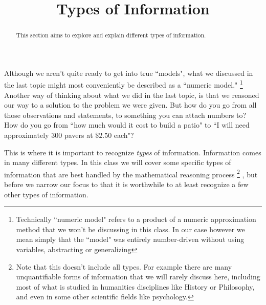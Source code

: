 \documentclass{ximeraXloud}
\title{Types of Information}
\begin{document}
\begin{abstract}
    This section aims to explore and explain different types of information.
\end{abstract}
\maketitle


Although we aren't quite ready to get into true ``models", what we discussed in the last topic might most conveniently be described as a ``numeric model."%
\footnote{Technically ``numeric model" refers to a product of a numeric approximation method that we won't be discussing in this class. In our case however we mean simply that the ``model" was entirely number-driven without using variables, abstracting or generalizing}
Another way of thinking about what we did in the last topic, is that we reasoned our way to a solution to the problem we were given. But how do you go from all those observations and statements, to something you can attach numbers to? How do you go from ``how much would it cost to build a patio" to ``I will need approximately 300 pavers at \$$2.50$ each"?

This is where it is important to recognize \textit{types} of information. Information comes in many different types. In this class we will cover some specific types of information that are best handled by the mathematical reasoning process%
\footnote{Note that this doesn't include all types. For example there are many unquantifiable forms of information that we will rarely discuss here, including most of what is studied in humanities disciplines like History or Philosophy, and even in some other scientific fields like psychology.}%
, but before we narrow our focus to that it is worthwhile to at least recognize a few other types of information.
\end{document}
